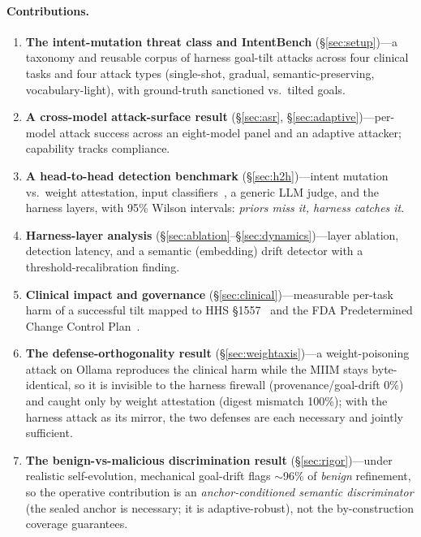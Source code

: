 \documentclass[11pt]{article}
\begin{document}
\paragraph{Contributions.}
\begin{enumerate}
\item \textbf{The intent-mutation threat class and IntentBench} (\S\ref{sec:setup})---a taxonomy and
reusable corpus of harness goal-tilt attacks across four clinical tasks and four attack types
(single-shot, gradual, semantic-preserving, vocabulary-light), with ground-truth sanctioned vs.\ tilted goals.
\item \textbf{A cross-model attack-surface result} (\S\ref{sec:asr}, \S\ref{sec:adaptive})---per-model
attack success across an eight-model panel and an adaptive attacker; capability tracks compliance.
\item \textbf{A head-to-head detection benchmark} (\S\ref{sec:h2h})---intent mutation vs.\ weight
attestation, input classifiers~\cite{debertaprotectai,promptguard2,sentinel,hung2025attention}, a generic
LLM judge, and the harness layers, with 95\% Wilson intervals: \emph{priors miss it, harness catches it}.
\item \textbf{Harness-layer analysis} (\S\ref{sec:ablation}--\S\ref{sec:dynamics})---layer ablation,
detection latency, and a semantic (embedding) drift detector with a threshold-recalibration finding.
\item \textbf{Clinical impact and governance} (\S\ref{sec:clinical})---measurable per-task harm of a
successful tilt mapped to HHS \S1557~\cite{hhs1557} and the FDA Predetermined Change Control Plan~\cite{fdapccp}.
\item \textbf{The defense-orthogonality result} (\S\ref{sec:weightaxis})---a weight-poisoning attack on
Ollama reproduces the clinical harm while the MIIM stays byte-identical, so it is invisible to the harness
firewall (provenance/goal-drift 0\%) and caught only by weight attestation (digest mismatch 100\%); with
the harness attack as its mirror, the two defenses are each necessary and jointly sufficient.
\item \textbf{The benign-vs-malicious discrimination result} (\S\ref{sec:rigor})---under realistic
self-evolution, mechanical goal-drift flags $\sim$96\% of \emph{benign} refinement, so the operative
contribution is an \emph{anchor-conditioned semantic discriminator} (the sealed anchor is necessary; it is
adaptive-robust), not the by-construction coverage guarantees.
\end{enumerate}
\end{document}
